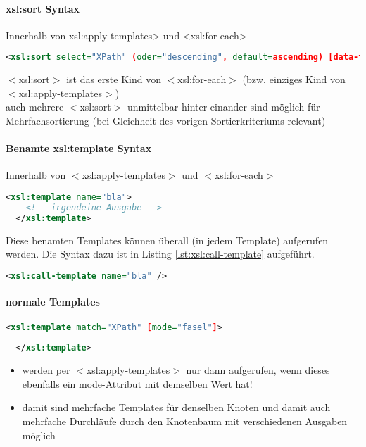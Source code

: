 \paragraph{xsl:sort Syntax}
Innerhalb von xsl:apply-templates> und <xsl:for-each>
\begin{lstlisting}[caption={xsl:sort Syntax}, label={lst:xsl:sort}, language={XML}]
  <xsl:sort select="XPath" (oder="descending", default=ascending) [data-type="number" (default=text)] />
\end{lstlisting}
$<$xsl:sort$>$ ist das erste Kind von $<$xsl:for-each$>$ (bzw. einziges Kind von $<$xsl:apply-templates$>$)\\
auch mehrere $<$xsl:sort$>$ unmittelbar hinter einander sind möglich für Mehrfachsortierung (bei Gleichheit des vorigen Sortierkriteriums relevant)

\paragraph{Benamte xsl:template Syntax}
Innerhalb von $<$xsl:apply-templates$>$ und $<$xsl:for-each$>$
\begin{lstlisting}[caption={xsl:template mit name Syntax}, label={lst:xsl:template_with_name}, language={XML}]
  <xsl:template name="bla">
    <!-- irgendeine Ausgabe -->
  </xsl:template>
\end{lstlisting}
Diese benamten Templates können überall (in jedem Template) aufgerufen werden. Die Syntax dazu ist in Listing \vref{lst:xsl:call-template} aufgeführt.\\
\begin{lstlisting}[caption={xsl:call-template Syntax}, label={lst:xsl:call-template}, language={XML}]
  <xsl:call-template name="bla" />
\end{lstlisting}

\paragraph{normale Templates}\hspace{1mm}
\begin{lstlisting}[caption={Normale xsl:template Syntax}, label={lst:xsl:template_normal}, language={XML}]
  <xsl:template match="XPath" [mode="fasel"]>
  
  </xsl:template>
\end{lstlisting}
\begin{itemize}
\item werden per $<$xsl:apply-templates$>$ nur dann aufgerufen, wenn dieses ebenfalls ein mode-Attribut mit demselben Wert hat!
\item damit sind mehrfache Templates für denselben Knoten und damit auch mehrfache Durchläufe durch den Knotenbaum mit verschiedenen Ausgaben möglich
\end{itemize}

